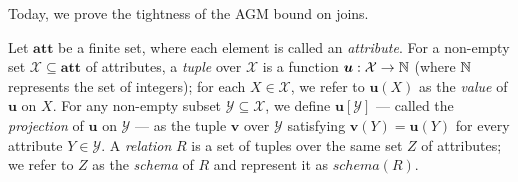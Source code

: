 



\usepackage{wasysym}

\title{}
\author{}
\date{}


\def\C{\mathcal{C}}
\def\E{\mathcal{E}}
\def\FF{\EuScript{F}}
\def\G{\mathcal{G}}
\def\GG{\EuScript{G}}
\def\H{\mathcal{H}}
\def\I{\mathcal{I}}
\def\J{\mathcal{J}}
\def\L{\mathcal{L}}
\def\Q{\mathcal{Q}}
\def\S{\mathcal{S}}
\def\T{\mathcal{T}}
\def\V{\mathcal{V}}
\def\W{\mathscr{W}}
\def\X{\mathcal{X}}
\def\Y{\mathcal{Y}}
\def\Z{\mathcal{Z}}
\def\att{\mit{diffatt}}
\def\boldatt{\mathbf{att}}
\def\dom{\mathbf{dom}}
\def\ext{\mathit{ext}}
\def\join{\mathit{join}}
\def\schema{\mathit{schema}}
\def\trans{\mathsf{T}}

\def\extraspacing{\vspace{4mm} \noindent}
\def\vgap{\vspace{4mm}}
\def\vslit{\vspace{2mm}}




Today, we prove the tightness of the AGM bound on joins.

\vgap

Let $\boldatt$ be a finite set, where each element is called an {\em attribute}. For a non-empty set $\X \subseteq \boldatt$ of attributes, a {\em tuple} over $\X$ is a function $\bm{u}: \X \rightarrow \intdom$ (where $\mathbb{N}$ represents the set of integers); for each $X \in \X$, we refer to $\bm{u}(X)$ as the {\em value} of $\bm{u}$ on $X$. For any non-empty subset $\Y \subseteq \X$, we define $\bm{u}[\Y]$ --- called the {\em projection} of $\bm{u}$ on $\Y$ --- as the tuple $\bm{v}$ over $\Y$ satisfying $\bm{v}(Y) = \bm{u}(Y)$ for every attribute $Y \in \Y$. A {\em relation} $R$ is a set of tuples over the same set $Z$ of attributes; we refer to $Z$ as the {\em schema} of $R$ and represent it as $\schema(R)$.

\vgap

